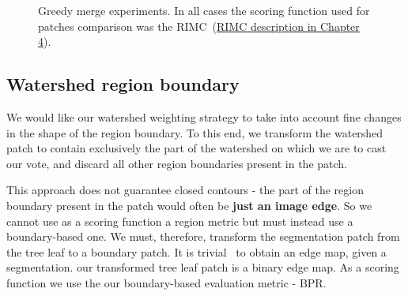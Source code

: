 \begin{figure}[ht!]
\centering
\caption{Greedy merge experiments. In all cases the scoring function used for patches comparison was the RIMC~(\hyperref[sec:ch4-RIMC-maths]{RIMC description in Chapter 4}).} %
\label{fig:segs-to-greedy-merge-RIMC}
\end{figure}

\subsection*{Watershed region boundary}
We would like our watershed weighting strategy to take into account fine changes in the shape of the region boundary. To this end, we transform the watershed patch to contain exclusively the part of the watershed on which we are to cast our vote, and discard all other region boundaries present in the patch.

This approach does not guarantee closed contours - the part of the region boundary present in the patch would often be \textbf{just an image edge}. So we cannot use as a scoring function a region metric but must instead use a boundary-based one. We must, therefore, transform the segmentation patch from the tree leaf to a boundary patch. It is trivial~\cite{Arbelaez11} to obtain an edge map, given a segmentation. our transformed tree leaf patch is a binary edge map. As a scoring function we use the our boundary-based evaluation metric - BPR.

